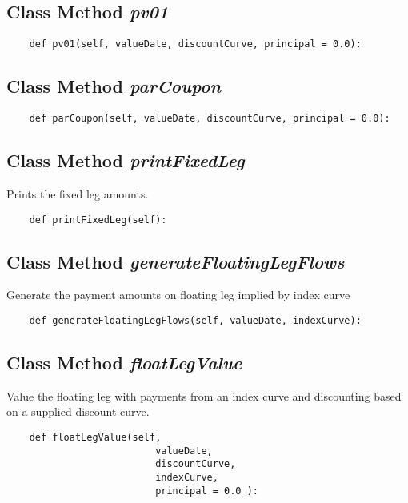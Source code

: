\documentclass[twoside,11pt]{book}
\begin{document}
\subsection{Class Method {\it pv01}}


\begin{lstlisting}
    def pv01(self, valueDate, discountCurve, principal = 0.0):
\end{lstlisting}

\subsection{Class Method {\it parCoupon}}


\begin{lstlisting}
    def parCoupon(self, valueDate, discountCurve, principal = 0.0):
\end{lstlisting}

\subsection{Class Method {\it printFixedLeg}}
Prints the fixed leg amounts. 

\begin{lstlisting}
    def printFixedLeg(self):
\end{lstlisting}

\subsection{Class Method {\it generateFloatingLegFlows}}
Generate the payment amounts on floating leg implied by index curve 

\begin{lstlisting}
    def generateFloatingLegFlows(self, valueDate, indexCurve):
\end{lstlisting}

\subsection{Class Method {\it floatLegValue}}
Value the floating leg with payments from an index curve and discounting based on a supplied discount curve. 

\begin{lstlisting}
    def floatLegValue(self, 
                          valueDate, 
                          discountCurve, 
                          indexCurve, 
                          principal = 0.0 ):
\end{lstlisting}
\end{document}
